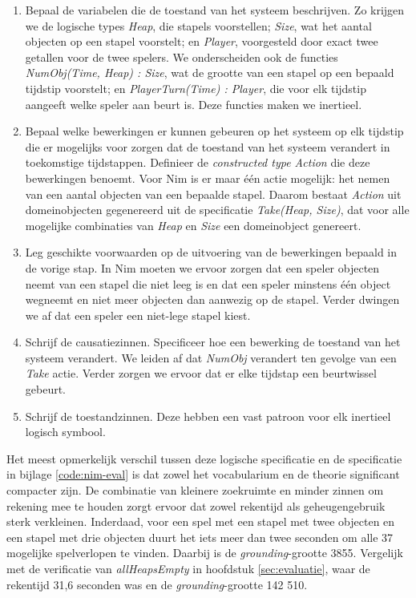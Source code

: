 \begin{enumerate}
	\item Bepaal de variabelen die de toestand van het systeem beschrijven. Zo krijgen we de logische types \textit{Heap}, die stapels voorstellen; \textit{Size}, wat het aantal objecten op een stapel voorstelt; en \textit{Player}, voorgesteld door exact twee getallen voor de twee spelers. We onderscheiden ook de functies \textit{NumObj(Time, Heap) : Size}, wat de grootte van een stapel op een bepaald tijdstip voorstelt; en \textit{PlayerTurn(Time) : Player}, die voor elk tijdstip aangeeft welke speler aan beurt is. Deze functies maken we inertieel.
	\item Bepaal welke bewerkingen er kunnen gebeuren op het systeem op elk tijdstip die er mogelijks voor zorgen dat de toestand van het systeem verandert in toekomstige tijdstappen. Definieer de \textit{constructed type Action} die deze bewerkingen benoemt. Voor Nim is er maar \'e\'en actie mogelijk: het nemen van een aantal objecten van een bepaalde stapel. Daarom bestaat \textit{Action} uit domeinobjecten gegenereerd uit de specificatie \textit{Take(Heap, Size)}, dat voor alle mogelijke combinaties van \textit{Heap} en \textit{Size} een domeinobject genereert.
	\item Leg geschikte voorwaarden op de uitvoering van de bewerkingen bepaald in de vorige stap. In Nim moeten we ervoor zorgen dat een speler objecten neemt van een stapel die niet leeg is en dat een speler minstens \'e\'en object wegneemt en niet meer objecten dan aanwezig op de stapel. Verder dwingen we af dat een speler een niet-lege stapel kiest.
	\item Schrijf de causatiezinnen. Specificeer hoe een bewerking de toestand van het systeem verandert. We leiden af dat \textit{NumObj} verandert ten gevolge van een \textit{Take} actie. Verder zorgen we ervoor dat er elke tijdstap een beurtwissel gebeurt.
	\item Schrijf de toestandzinnen. Deze hebben een vast patroon voor elk inertieel logisch symbool.
\end{enumerate}

Het meest opmerkelijk verschil tussen deze logische specificatie en de specificatie in bijlage \ref{code:nim-eval} is dat zowel het vocabularium en de theorie significant compacter zijn. De combinatie van kleinere zoekruimte en minder zinnen om rekening mee te houden zorgt ervoor dat zowel rekentijd als geheugengebruik sterk verkleinen. Inderdaad, voor een spel met een stapel met twee objecten en een stapel met drie objecten duurt het iets meer dan twee seconden om alle 37 mogelijke spelverlopen te vinden. Daarbij is de \textit{grounding}-grootte 3855. Vergelijk met de verificatie van \textit{allHeapsEmpty} in hoofdstuk \ref{sec:evaluatie}, waar de rekentijd 31,6 seconden was en de \textit{grounding}-grootte 142 510.

